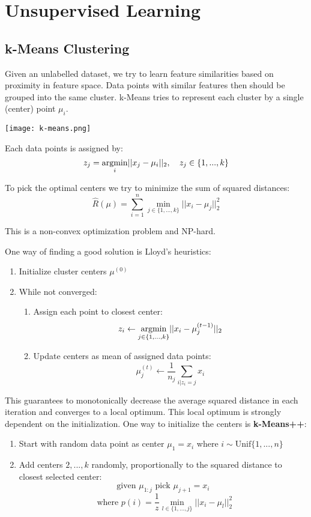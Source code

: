 \section{Unsupervised Learning}

\subsection{k-Means Clustering}

Given an unlabelled dataset, we try to learn feature similarities based on proximity in feature space. Data points with similar features then should be grouped into the same cluster. k-Means tries to represent each cluster by a single (center) point $\mu_i$.

\begin{center}
	\texttt{[image: k-means.png]}
\end{center}

Each data points is assigned by:
$$z_j = \underset{i}{\text{argmin}} ||x_j - \mu_i||_2, \quad z_j \in \{1, ..., k\}$$

To pick the optimal centers we try to minimize the sum of squared distances:
$$\hat{R} (\mu) = \sum_{i=1}^n \min_{j\in \{1,...,k\}} ||x_i - \mu_j||_2^2$$

This is a non-convex optimization problem and NP-hard. 

\columnbreak

One way of finding a good solution is Lloyd's heuristics:
\begin{enumerate}
	\item Initialize cluster centers $\mu^{(0)}$
	\item While not converged:
		\begin{enumerate}
			\item Assign each point to closest center:
				$$z_i \leftarrow \underset{j\in \{1,...,k\}}{\text{argmin}} ||x_i - \mu_j^{(t-1)}||_2$$		
			\item Update centers as mean of assigned data points:
				$$\mu_j^{(t)} \leftarrow \frac{1}{n_j} \sum_{i | z_i = j} x_i$$  	
		\end{enumerate}
\end{enumerate}

This guarantees to monotonically decrease the average squared distance in each iteration and converges to a local optimum. This local optimum is strongly dependent on the initialization. One way to initialize the centers is \textbf{k-Means++}:

\begin{enumerate}
	\item Start with random data point as center $\mu_1 = x_i$ where $i \sim \text{Unif}\{1,...,n\}$
	\item Add centers $2,...,k$ randomly, proportionally to the squared distance to closest selected center:
		$$\text{given } \mu_{1:j} \text{ pick } \mu_{j+1} = x_i$$ $$\text{ where } p(i) = \frac{1}{z} \min_{l \in \{1,...,j\}} ||x_i - \mu_l||_2^2$$
\end{enumerate}


